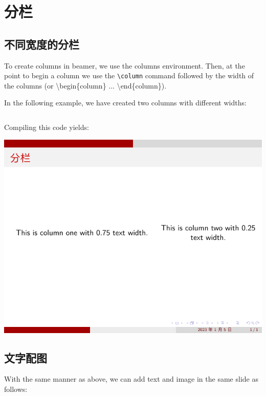 \section{分栏}

\subsection{不同宽度的分栏}

To create columns in beamer, we use the columns environment. Then, at the point to begin a column we use the \verb|\column| command followed by the width of the columns (or {\ttfamily \textbackslash begin\{column\} ...  \textbackslash end\{column\}}).

In the following example, we have created two columns with different widths:

\inputminted[linenos=true]{latex}{examples/beamer/column-different-widths.tex}

Compiling this code yields:

\includegraphics{examples/beamer/column-different-widths.pdf}

\subsection{文字配图}

With the same manner as above, we can add text and image in the same slide as follows:

\inputminted[linenos=true]{latex}{examples/beamer/column-figure-next-to-text.tex}

